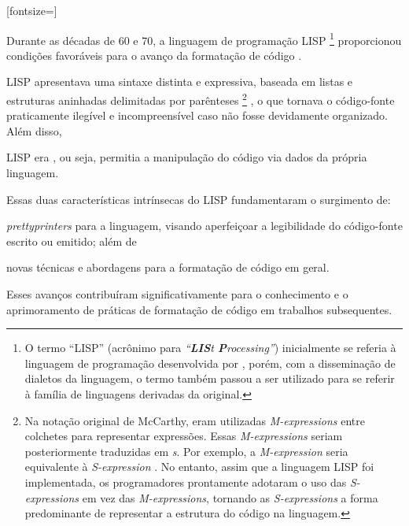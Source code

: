 \documentclass
  [11pt,a4paper,english,brazil,openright,sumario=tradicional,twoside]
  {abntex2}
\begin{document}
  \newsavebox\sexpressionexample
  \begin{lrbox}{\sexpressionexample}
    [fontsize=\footnotesize]
  \end{lrbox}

  Durante as décadas de 60 e 70, a linguagem de programação LISP%
  \footnote
    { O termo ``LISP'' (acrônimo para
      \textit{``\textbf{LIS}t \textbf{P}rocessing''}) inicialmente se referia à
      linguagem de programação desenvolvida por
      \textcite{mccarthy-1960-recursive}, porém, com a disseminação de dialetos
      da linguagem, o termo também passou a ser utilizado para se referir à
      família de linguagens derivadas da original.}
  proporcionou condições favoráveis para o avanço da formatação de código
  \cite[2]{yelland-2015-new}.
  \begin{inparaenum}
    \item LISP apresentava uma sintaxe distinta e expressiva, baseada em listas
          e estruturas aninhadas delimitadas por parênteses%
          \footnote
            { Na notação original de McCarthy, eram utilizadas
              \textit{M-expressions} entre colchetes para representar
              expressões. Essas \textit{M-expressions} seriam posteriormente
              traduzidas em \textit{s}. Por exemplo, a
              \textit{M-expression} \usebox{\mexpressionexample} seria
              equivalente à \textit{S-expression} \usebox{\sexpressionexample}.
              No entanto, assim que a linguagem LISP foi implementada, os
              programadores prontamente adotaram o uso das
              \textit{S-expressions} em vez das \textit{M-expressions},
              tornando as \textit{S-expressions} a forma predominante de
              representar a estrutura do código na linguagem.}%
          , o que tornava o código-fonte praticamente ilegível e
          incompreensível caso não fosse devidamente organizado. Além disso,
    \item LISP era , ou seja, permitia a manipulação do
          código via dados da própria linguagem.
  \end{inparaenum}
  Essas duas características intrínsecas do LISP fundamentaram o surgimento de:
  \begin{inparaenum}
    \item \textit{prettyprinters} para a linguagem, visando aperfeiçoar a
          legibilidade do código-fonte escrito ou emitido; além de
    \item novas técnicas e abordagens para a formatação de código em geral.
  \end{inparaenum}
  Esses avanços contribuíram significativamente para o conhecimento e o
  aprimoramento de práticas de formatação de código em trabalhos subsequentes.
\end{document}
